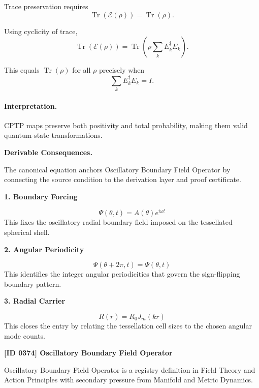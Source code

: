 Trace preservation requires
\begin{equation}
\operatorname{Tr}(\mathcal{E}(\rho))=\operatorname{Tr}(\rho).
\end{equation}

Using cyclicity of trace,
\begin{equation}
\operatorname{Tr}(\mathcal{E}(\rho))
=
\operatorname{Tr}\left(
\rho\sum_k E_k^\dagger E_k
\right).
\end{equation}

This equals $\operatorname{Tr}(\rho)$ for all $\rho$ precisely when
\begin{equation}
\boxed{
\sum_k E_k^\dagger E_k = I .
}
\end{equation}

\paragraph{Interpretation.}
CPTP maps preserve both positivity and total probability, making them valid quantum-state transformations.

\par\vspace{0.35em}
\noindent\textbf{Derivable Consequences.}\quad
\begingroup
\footnotesize
\raggedright
The canonical equation anchors Oscillatory Boundary Field Operator by connecting the source condition to the derivation layer and proof certificate.
\par\endgroup

\noindent\textbf{1. Boundary Forcing}\par
\[
\Psi(\theta,t)=A(\theta)e^{i\omega t}
\]
\noindent This fixes the oscillatory radial boundary field imposed on the tessellated spherical shell.\par
\noindent\textbf{2. Angular Periodicity}\par
\[
\Psi(\theta+2\pi,t)=\Psi(\theta,t)
\]
\noindent This identifies the integer angular periodicities that govern the sign-flipping boundary pattern.\par
\noindent\textbf{3. Radial Carrier}\par
\[
R(r)=R_{0}J_{m}(kr)
\]
\noindent This closes the entry by relating the tessellation cell sizes to the chosen angular mode counts.\par

\clearpage
\noindent\textbf{[ID 0374] Oscillatory Boundary Field Operator}\par
\vspace{0.35em}
\begingroup\small
{}
Oscillatory Boundary Field Operator is a registry definition in Field Theory and Action Principles with secondary pressure from Manifold and Metric Dynamics.

